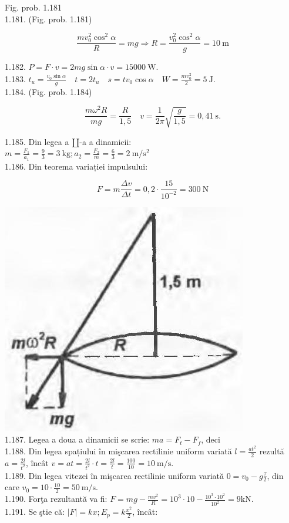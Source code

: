 \documentclass[10pt]{article}
\begin{document}
Fig. prob. 1.181\\
1.181. (Fig. prob. 1.181)

$$
\frac{m v_{0}^{2} \cos ^{2} \alpha}{R}=m g \Rightarrow R=\frac{v_{0}^{2} \cos ^{2} \alpha}{g}=10 \mathrm{~m}
$$

1.182. $P=F \cdot v=2 m g \sin \alpha \cdot v=15000 \mathrm{~W}$.\\
1.183. $t_{u}=\frac{v_{0} \sin \alpha}{g} \quad t=2 t_{u} \quad s=t v_{0} \cos \alpha \quad W=\frac{m v_{0}^{2}}{2}=5 \mathrm{~J}$.\\
1.184. (Fig. prob. 1.184)

$$
\frac{m \omega^{2} R}{m g}=\frac{R}{1,5} \quad v=\frac{1}{2 \pi} \sqrt{\frac{g}{1,5}}=0,41 \mathrm{~s} .
$$

1.185. Din legea a $\amalg$-a a dinamicii:\\
$m=\frac{F_{1}}{a_{1}}=\frac{9}{3}=3 \mathrm{~kg} ; a_{2}=\frac{F_{2}}{m}=\frac{6}{3}=2 \mathrm{~m} / \mathrm{s}^{2}$\\
1.186. Din teorema variației impulsului:

$$
F=m \frac{\Delta v}{\Delta t}=0,2 \cdot \frac{15}{10^{-2}}=300 \mathrm{~N}
$$

\includegraphics[max width=\textwidth, center]{2025_07_01_5b3ff9fa0d508c8e9f17g-239(2)}\\
1.187. Legea a doua a dinamicii se scrie: $m a=F_{t}-F_{f}$, deci\\
1.188. Din legea spațiului în mişcarea rectilinie uniform variată $l=\frac{a t^{2}}{2}$ rezultă $a=\frac{2 l}{t^{2}}$, încât $v=a t=\frac{2 l}{t^{2}} \cdot t=\frac{2 l}{t}=\frac{100}{10}=10 \mathrm{~m} / \mathrm{s}$.\\
1.189. Din legea vitezei în mişcarea rectilinie uniform variată $0=v_{0}-g \frac{\tau}{2}$, din care $v_{0}=10 \cdot \frac{10}{2}=50 \mathrm{~m} / \mathrm{s}$.\\
1.190. Forţa rezultantă va fi: $F=m g-\frac{m v^{2}}{R}=10^{3} \cdot 10-\frac{10^{3} \cdot 10^{2}}{10^{2}}=9 \mathrm{kN}$.\\
1.191. Se ştie că: $|F|=k x ; E_{p}=k \frac{x^{2}}{2}$, încât:
\end{document}

